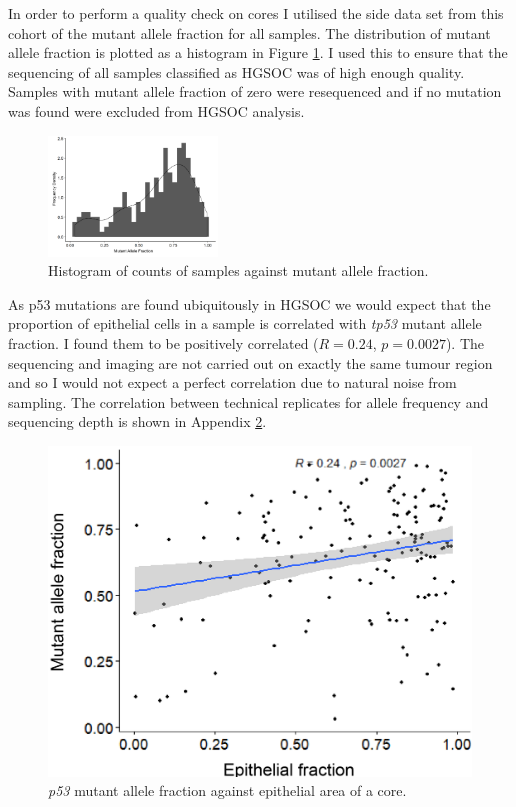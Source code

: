 In order to perform a quality check on cores I utilised the side data set from this cohort of the mutant allele fraction for all samples. The distribution of mutant allele fraction is plotted as a histogram in  Figure \ref{fig:maf_dist}. I used this to ensure that the sequencing of all samples classified as HGSOC was of high enough quality. Samples with mutant allele fraction of zero were resequenced and if no mutation was found were excluded from HGSOC analysis.
\begin{figure}
    \centering
    \includegraphics[width=0.4\textwidth]{Chapter2/Figs/Raster/MAF_distribution.png}
    \caption{Histogram of counts of samples against mutant allele fraction.}
    \label{fig:maf_dist}
\end{figure}

 As p53 mutations are found ubiquitously in HGSOC we would expect that the proportion of epithelial cells in a sample is correlated with \textit{tp53} mutant allele fraction.  I found them to be positively correlated ($R= 0.24$, $p=0.0027$). The sequencing and imaging are not carried out on exactly the same tumour region and so I would not expect a perfect correlation due to natural noise from sampling. The correlation between technical replicates for allele frequency and sequencing depth is shown in Appendix \ref{fig:p53_allele}. 
\begin{figure}
    \centering
    \includegraphics{Chapter2/Figs/Raster/maf_epithelial.png}
    \caption{\textit{p53} mutant allele fraction against epithelial area of a core.}
    \label{fig:p53_allele}
\end{figure}




